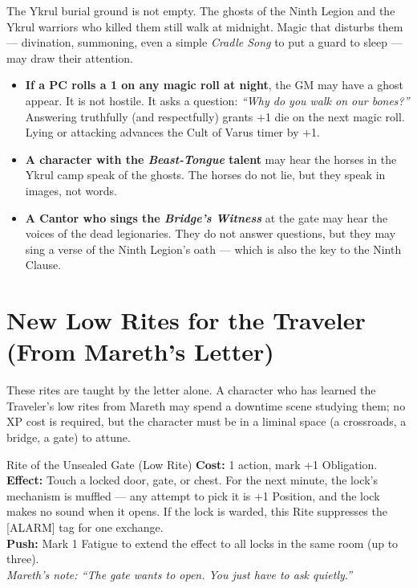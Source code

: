 \documentclass[10pt,twoside]{book}
\newcommand{\tag}[1]{\textsc{[#1]}}
\begin{document}
The Ykrul burial ground is not empty. The ghosts of the Ninth Legion and the Ykrul warriors who killed them still walk at midnight. Magic that disturbs them --- divination, summoning, even a simple \textit{Cradle Song} to put a guard to sleep --- may draw their attention.

\begin{itemize}
\item \textbf{If a PC rolls a 1 on any magic roll at night}, the GM may have a ghost appear. It is not hostile. It asks a question: \textit{``Why do you walk on our bones?''} Answering truthfully (and respectfully) grants +1 die on the next magic roll. Lying or attacking advances the Cult of Varus timer by +1.
\item \textbf{A character with the \textit{Beast-Tongue} talent} may hear the horses in the Ykrul camp speak of the ghosts. The horses do not lie, but they speak in images, not words.
\item \textbf{A Cantor who sings the \textit{Bridge's Witness}} at the gate may hear the voices of the dead legionaries. They do not answer questions, but they may sing a verse of the Ninth Legion's oath --- which is also the key to the Ninth Clause.
\end{itemize}

\section*{New Low Rites for the Traveler (From Mareth's Letter)}

These rites are taught by the letter alone. A character who has learned the Traveler's low rites from Mareth may spend a downtime scene studying them; no XP cost is required, but the character must be in a liminal space (a crossroads, a bridge, a gate) to attune.

\begin{sidebar}{Rite of the Unsealed Gate (Low Rite)}
\textbf{Cost:} 1 action, mark +1 Obligation. \\
\textbf{Effect:} Touch a locked door, gate, or chest. For the next minute, the lock's mechanism is muffled --- any attempt to pick it is +1 Position, and the lock makes no sound when it opens. If the lock is warded, this Rite suppresses the \tag{ALARM} tag for one exchange. \\
\textbf{Push:} Mark 1 Fatigue to extend the effect to all locks in the same room (up to three). \\
\textit{Mareth's note: ``The gate wants to open. You just have to ask quietly.''}
\end{sidebar}
\end{document}
